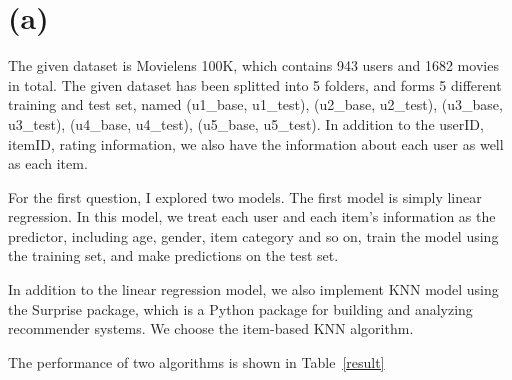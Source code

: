 
\usepackage{graphicx}
\usepackage{float}
\usepackage{multicol}
\usepackage{balance}
\usepackage{multicol}
\usepackage{multirow}
\usepackage{epstopdf}
\usepackage{epsfig}
\usepackage{makeidx}
\usepackage{bm}
\usepackage{pbox}
\usepackage{pdflscape}
\usepackage{url}
\usepackage{framed}
\usepackage{mathtools}
\usepackage{adjustbox}
\usepackage{amsmath}
\usepackage{hyperref}
\usepackage{subcaption}
\usepackage{cite}
\usepackage{amsfonts}

\usepackage{graphicx, amssymb, amsmath, listings, float, mathtools}
\usepackage{color, url}
\lstset{language = Python}
\lstset{breaklines}
\lstset{extendedchars=false}

\oddsidemargin 0in
\evensidemargin 0in
\textwidth 6.5in
\topmargin -0.6in
\textheight 9.0in





\section*{(a)}

The given dataset is Movielens 100K, which contains 943 users and 1682 movies in total. The given dataset has been splitted into 5 folders, and forms 5 different training and test set, named (u1\_base, u1\_test), (u2\_base, u2\_test), (u3\_base, u3\_test), (u4\_base, u4\_test), (u5\_base, u5\_test). In addition to the userID, itemID, rating information, we also have the information about each user as well as each item. 

For the first question, I explored two models. The first model is simply linear regression. In this model, we treat each user and each item's information as the predictor, including age, gender, item category and so on, train the model using the training set, and make predictions on the test set. 

In addition to the linear regression model, we also implement KNN model using the Surprise package, which is a Python package for building and analyzing recommender systems. We choose the item-based KNN algorithm. 

The performance of two algorithms is shown in Table~\ref{result}

